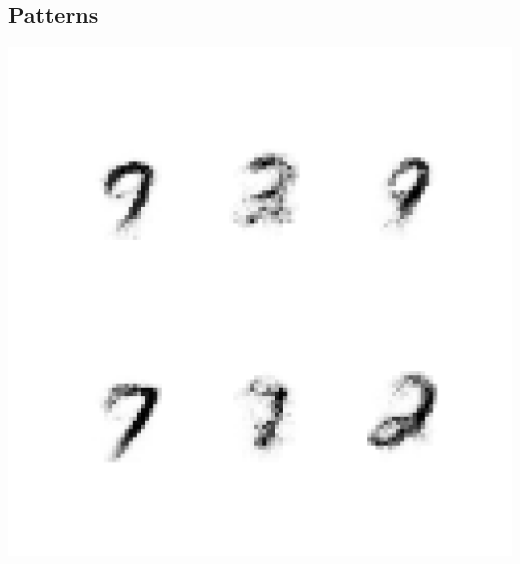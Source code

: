 \documentclass[11pt]{article}
\begin{document}
\subsection*{Patterns}
\label{sec-7-4}
\includegraphics[width=.9\linewidth]{figures/snb_0_1.png}
\end{document}
